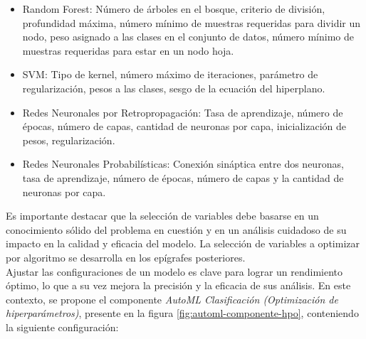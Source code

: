 \begin{itemize}
	\item Random Forest: Número de árboles en el bosque, criterio de división, profundidad máxima, número mínimo de muestras requeridas para dividir un nodo, peso asignado a las clases en el conjunto de datos, número mínimo de muestras requeridas para estar en un nodo hoja.
	
	\item SVM: Tipo de kernel, número máximo de iteraciones, parámetro de regularización, pesos a las clases, sesgo de la ecuación del hiperplano.
	
	\item Redes Neuronales por Retropropagación: Tasa de aprendizaje, número de épocas, número de capas, cantidad de neuronas por capa, inicialización de pesos, regularización.
	
	\item Redes Neuronales Probabilísticas: Conexión sináptica entre dos neuronas, tasa de aprendizaje, número de épocas, número de capas y la cantidad de neuronas por capa.
\end{itemize}

Es importante destacar que la selección de variables debe basarse en un conocimiento sólido del problema en cuestión y en un análisis cuidadoso de su impacto en la calidad y eficacia del modelo. La selección de variables a optimizar por algoritmo se desarrolla en los epígrafes posteriores. \\
Ajustar las configuraciones de un modelo es clave para lograr un rendimiento óptimo, lo que a su vez mejora la precisión y la eficacia de sus análisis. En este contexto, se propone el componente \textit{AutoML Clasificación (Optimización de hiperparámetros)},  presente en la figura \ref{fig:automl-componente-hpo}, conteniendo la siguiente configuración:


